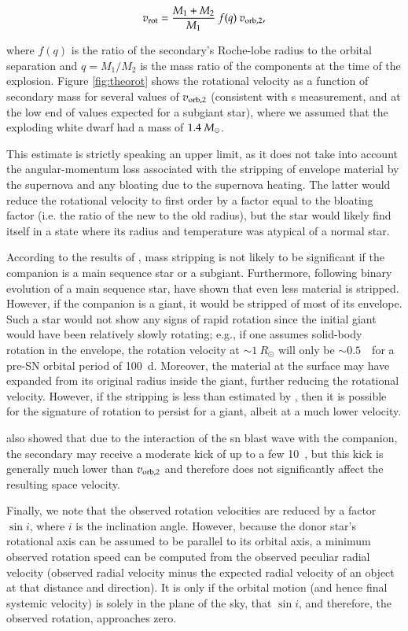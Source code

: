 $$ v_{\rm rot} = {M_1 + M_2\over M_1}~f(q)~v_{\rm orb, 2} ,$$

where $f(q)$ is the ratio of the secondary's Roche-lobe radius to the
orbital separation \citep[e.g., given by][]{1983ApJ...268..368E} and
$q=M_1/M_2$ is the mass ratio of the components at the time of the
explosion. Figure \ref{fig:theorot} shows the rotational velocity as a
function of secondary mass for several values of $v_{\rm orb, 2}$ (consistent with \rl s measurement, and at the low end of values expected for a subgiant star),
where we assumed that the exploding white dwarf had a mass of
$1.4~\hbox{$M_{\odot}$}$.

This estimate is strictly speaking an upper limit, as it does not
take into account the angular-momentum loss associated with the
stripping of envelope material by the supernova and any bloating due
to the supernova heating. The latter would reduce the rotational
velocity to first order by a factor equal to the bloating
factor (i.e. the ratio of the new to the old radius), but the
star would likely find itself in a state where its radius and
temperature was atypical of a normal star. 

According to the results of  \citet{2000ApJS..128..615M}, mass stripping is
not likely to be significant if the companion is a main sequence star
or a subgiant. Furthermore, following binary evolution of a main sequence star, \citet{2008A&A...489..943P} have shown that even less material is stripped. However, if the companion is a giant, it would be
stripped of most of its envelope.  Such a star would not show any
signs of rapid rotation since the initial giant would have been
relatively slowly rotating; e.g., if one assumes solid-body rotation
in the envelope, the rotation velocity at $\sim 1~R_\odot$ will only
be $\sim 0.5$~\kms\ for a pre-SN orbital period of
100~d. Moreover, the material at the surface may have expanded from
its original radius inside the giant, further reducing the rotational
velocity. However, if the stripping is less than estimated by  \citet{2000ApJS..128..615M}, then it is possible for the signature of rotation to persist for a giant, albeit at a much lower velocity.

 \citet{2000ApJS..128..615M} also showed that due to the interaction
of the \gls*{sn} blast wave with the companion, the secondary may receive
a moderate kick of up to a few 10~\kms, but this kick
is generally much lower than $v_{\rm orb,2}$ and therefore does
not significantly affect the resulting space velocity.

Finally, we note that the observed rotation velocities are reduced by
a factor $\sin i$, where $i$ is the inclination angle.  However,
because the donor star's rotational axis can be assumed to be parallel
to its orbital axis, a minimum observed rotation speed can be computed
from the observed peculiar radial velocity (observed radial velocity
minus the expected radial velocity of an object at that distance and
direction). It is only if the orbital motion (and hence final systemic
velocity) is solely in the plane of the sky, that $\sin{i}$, and
therefore, the observed rotation, approaches
zero.\label{rotation_expl}

